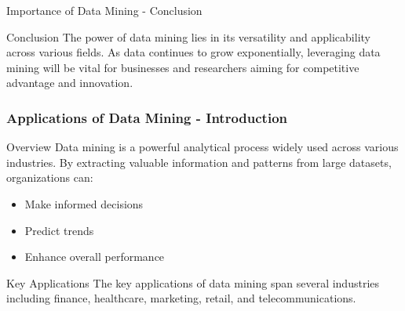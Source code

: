 \documentclass[aspectratio=169]{beamer}
\begin{document}
\begin{frame}[fragile]{Importance of Data Mining - Conclusion}
    \begin{block}{Conclusion}
        The power of data mining lies in its versatility and applicability across various fields. As data continues to grow exponentially, leveraging data mining will be vital for businesses and researchers aiming for competitive advantage and innovation.
    \end{block}
\end{frame}

\begin{frame}[fragile]
    \frametitle{Applications of Data Mining - Introduction}
    \begin{block}{Overview}
        Data mining is a powerful analytical process widely used across various industries. By extracting valuable information and patterns from large datasets, organizations can:
    \end{block}
    \begin{itemize}
        \item Make informed decisions
        \item Predict trends
        \item Enhance overall performance
    \end{itemize}
    \begin{block}{Key Applications}
        The key applications of data mining span several industries including finance, healthcare, marketing, retail, and telecommunications.
    \end{block}
\end{frame}
\end{document}
